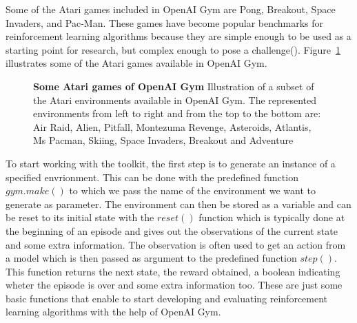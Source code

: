 Some of the Atari games included in OpenAI Gym are Pong, Breakout, Space Invaders, and Pac-Man. These games have become popular benchmarks for reinforcement learning algorithms because they are simple enough to be used as a starting point for research, but complex enough to pose a challenge(\cite{brockman_openai_2016}). Figure~\ref{fig:atari_games} illustrates some of the Atari games available in OpenAI Gym.

\begin{figure}[!ht]
\centering
{}
\caption[Atari games of OpenAI Gym]{
  \textbf{Some Atari games of OpenAI Gym}
  Illustration of a subset of the Atari environments available in OpenAI Gym. The represented environments from left to right and from the top to the bottom are: Air Raid, Alien, Pitfall, Montezuma Revenge, Asteroids, Atlantis, Ms Pacman, Skiing, Space Invaders, Breakout and Adventure
 }
\label{fig:atari_games}
\end{figure}



To start working with the toolkit, the first step is to generate an instance of a specified envrionment. This can be done with the predefined function $gym.make()$ to which we pass the name of the environment we want to generate as parameter. The environment can then be stored as a variable and can be reset to its initial state with the $reset()$ function which is typically done at the beginning of an episode and gives out the observations of the current state and some extra information. The observation is often used to get an action from a model which is then passed as argument to the predefined function $step()$. This function returns the next state, the reward obtained, a boolean indicating wheter the episode is over and some extra information too. These are just some basic functions that enable to start developing and evaluating reinforcement learning algorithms with the help of OpenAI Gym.







